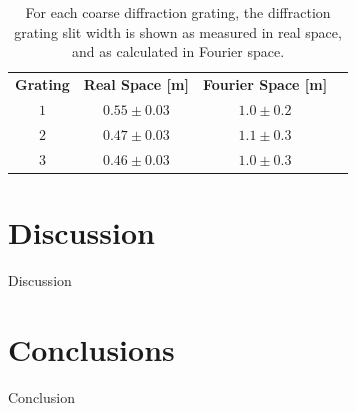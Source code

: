 \documentclass[twocolumn]{revtex4}
\begin{document}
\begin{table}[h!]
\centering
\begin{tabular}{c@{\hskip 20pt}c@{\hskip 20pt}c@{\hskip 20pt}c} 
 \hline
 \textbf{Grating} & \textbf{Real Space [m]} & \textbf{Fourier Space [m]} \\ [0.5ex] 
 $1$ &$0.55\pm0.03$ & $1.0\pm0.2$ \\ 
 $2$ & $0.47\pm0.03$ & $1.1\pm0.3$ \\
 $3$ & $0.46\pm0.03$ & $1.0\pm0.3$ \\
 \hline
\end{tabular}
\caption{For each coarse diffraction grating, the diffraction grating slit width is shown as measured in real space, and as calculated in Fourier space.}
\end{table}

\vspace{-3ex}
\section{Discussion}
\vspace{-2ex}

Discussion

\vspace{-5ex}
\section{Conclusions}
\vspace{-2ex}

Conclusion
\end{document}
